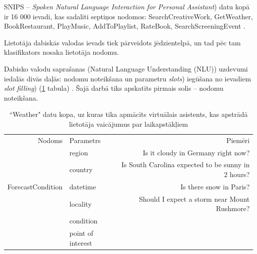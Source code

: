 SNIPS -- \textit{Spoken Natural Language Interaction for Personal Assistant}) datu kopā ir 16 000 ievadi, kas sadalīti septiņos nodomos: SearchCreativeWork, GetWeather, BookRestaurant, PlayMusic, AddToPlaylist, RateBook, SearchScreeningEvent \cite{snips-2018}.


Lietotāja dabiskās valodas ievads tiek pārveidots jēdzientelpā, un tad pēc tam klasifikators nosaka lietotāja nodomu.

Dabisko valodu saprašanas (Natural Language Understanding (NLU)) uzdevumi iedalās divās daļās: nodomu noteikšana un parametru \textit{slots}) iegūšana no ievadiem \textit{slot filling}) (\ref{tab:slots} tabula) \cite{snips-2018}. Šajā darbā tiks apskatīts pirmais solis -- nodomu noteikšana.


\begin{table}[htbp]
    \centering
    \caption{``Weather" datu kopa, uz kuras tika apmācīts virtuālais asistents, kas apstrādā lietotāja vaicājumus par laikapstākļiem  \cite{snips-2018}}
    \begin{tabular}{rlr}
        Nodoms            & Parametrs                                           & Piemēri                                                                                                                                            \\
        & \textcolor[rgb]{ .439,  .188,  .627}{ region}           & Is it \textcolor[rgb]{ 1,  .753,  0}{cloudy} in \textcolor[rgb]{ 1,  0,  0}{Germany} \textcolor[rgb]{ .573,  .816,  .314}{ right now}?                         \\
        & \textcolor[rgb]{ 1,  0,  0}{ country}                   & Is \textcolor[rgb]{ .439,  .188,  .627}{South Carolina} expected to be \textcolor[rgb]{ 1,  .753,  0}{sunny} \textcolor[rgb]{ .573,  .816,  .314}{in 2 hours}? \\
        ForecastCondition & \textcolor[rgb]{ .573,  .816,  .314}{ datetime}         & Is there \textcolor[rgb]{ 1,  .753,  0}{snow} in \textcolor[rgb]{ 0,  .69,  .941}{Paris}?                                                                  \\
        & \textcolor[rgb]{ 0,  .69,  .941}{ locality}             & Should I expect a \textcolor[rgb]{ 1,  .753,  0}{storm} near \textcolor[rgb]{ .929,  .49,  .192}{Mount Rushmore}?                                          \\
        & \textcolor[rgb]{ 1,  .753,  0}{ condition}              &                                                                                                                                                    \\
        & \textcolor[rgb]{ .929,  .49,  .192}{ point of interest} &                                                                                                                                                    \\
    \end{tabular}%
    \label{tab:slots}%
\end{table}%


